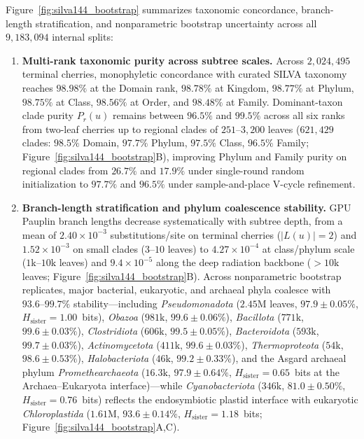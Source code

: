 \documentclass[11pt,a4paper]{article}
\makeatletter
\DeclareRobustCommand{\_}{\ifmmode\nfss@text{\textunderscore}\else\textunderscore\allowbreak\fi}
\theoremstyle{definition}
\makeatother
\begin{document}
Figure~\ref{fig:silva144_bootstrap} summarizes taxonomic concordance, branch-length stratification, and nonparametric bootstrap uncertainty across all $9{,}183{,}094$ internal splits:
\begin{enumerate}
 \item \textbf{Multi-rank taxonomic purity across subtree scales.} Across $2{,}024{,}495$ terminal cherries, monophyletic concordance with curated SILVA taxonomy reaches $98.98\%$ at the Domain rank, $98.78\%$ at Kingdom, $98.77\%$ at Phylum, $98.75\%$ at Class, $98.56\%$ at Order, and $98.48\%$ at Family. Dominant-taxon clade purity $P_r(u)$ remains between $96.5\%$ and $99.5\%$ across all six ranks from two-leaf cherries up to regional clades of $251\text{--}3{,}200$ leaves ($621{,}429$ clades: $98.5\%$ Domain, $97.7\%$ Phylum, $97.5\%$ Class, $96.5\%$ Family; Figure~\ref{fig:silva144_bootstrap}B), improving Phylum and Family purity on regional clades from $26.7\%$ and $17.9\%$ under single-round random initialization to $97.7\%$ and $96.5\%$ under sample-and-place V-cycle refinement.
 \item \textbf{Branch-length stratification and phylum coalescence stability.} GPU Pauplin branch lengths decrease systematically with subtree depth, from a mean of $2.40\times10^{-3}$ substitutions/site on terminal cherries ($|L(u)|=2$) and $1.52\times10^{-3}$ on small clades ($3\text{--}10$ leaves) to $4.27\times10^{-4}$ at class/phylum scale ($1\text{k--}10\text{k}$ leaves) and $9.4\times10^{-5}$ along the deep radiation backbone ($>10\text{k}$ leaves; Figure~\ref{fig:silva144_bootstrap}B). Across nonparametric bootstrap replicates, major bacterial, eukaryotic, and archaeal phyla coalesce with $93.6\text{--}99.7\%$ stability---including \textit{Pseudomonadota} ($2.45\text{M}$ leaves, $97.9\pm0.05\%$, $H_{\mathrm{sister}}=1.00$~bits), \textit{Obazoa} ($981\text{k}$, $99.6\pm0.06\%$), \textit{Bacillota} ($771\text{k}$, $99.6\pm0.03\%$), \textit{Clostridiota} ($606\text{k}$, $99.5\pm0.05\%$), \textit{Bacteroidota} ($593\text{k}$, $99.7\pm0.03\%$), \textit{Actinomycetota} ($411\text{k}$, $99.6\pm0.03\%$), \textit{Thermoproteota} ($54\text{k}$, $98.6\pm0.53\%$), \textit{Halobacteriota} ($46\text{k}$, $99.2\pm0.33\%$), and the Asgard archaeal phylum \textit{Promethearchaeota} ($16.3\text{k}$, $97.9\pm0.64\%$, $H_{\mathrm{sister}}=0.65$~bits at the Archaea--Eukaryota interface)---while \textit{Cyanobacteriota} ($346\text{k}$, $81.0\pm0.50\%$, $H_{\mathrm{sister}}=0.76$~bits) reflects the endosymbiotic plastid interface with eukaryotic \textit{Chloroplastida} ($1.61\text{M}$, $93.6\pm0.14\%$, $H_{\mathrm{sister}}=1.18$~bits; Figure~\ref{fig:silva144_bootstrap}A,C).
\end{enumerate}
\end{document}

